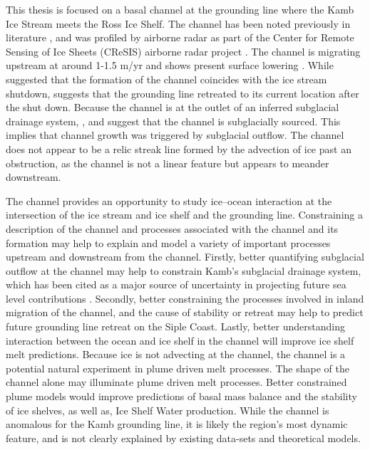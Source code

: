 This thesis is focused on a basal channel at the grounding line where the Kamb Ice Stream meets the Ross Ice Shelf. The channel has been noted previously in literature \citep{le2009subglacial,alley2016impacts,kim2016active,goeller2015subglacial,horgan2017poststagnation}, and was profiled by airborne radar as part of the Center for Remote Sensing of Ice Sheets (CReSIS) airborne radar project \citep{arnold2020cresis}. The channel is migrating upstream at around 1-1.5 m/yr and shows present surface lowering \citep{kim2016active}. While \cite{kim2016active} suggested that the formation of the channel coincides with the ice stream shutdown,   \cite{horgan2017poststagnation} suggests that the grounding line retreated to its current location after the shut down. Because the channel is at the outlet of an inferred subglacial drainage system, \cite{le2009subglacial}, \cite{alley2016impacts} and \cite{kim2016active} suggest that the channel is subglacially sourced. This implies that channel growth was triggered by subglacial outflow. The channel does not appear to be a relic streak line formed by the advection of ice past an obstruction, as the channel is not a linear feature but appears to meander downstream.



The channel provides an opportunity to study ice--ocean interaction at the intersection of the ice stream and ice shelf and the grounding line.  Constraining a description of the channel and processes associated with the channel and its formation may help to explain and model a variety of important processes upstream and downstream from the channel. Firstly, better quantifying subglacial outflow at the channel may help to constrain Kamb's subglacial drainage system, which has been cited as a major source of uncertainty in projecting future sea level contributions \citep{bougamont2015reactivation}. Secondly, better constraining the processes involved in inland migration of the channel, and the cause of stability or retreat may help to predict future grounding line retreat on the Siple Coast. Lastly, better understanding interaction between the ocean and ice shelf in the channel will improve ice shelf melt predictions.  Because ice is not advecting at the channel, the channel is a potential natural experiment in plume driven melt processes. The shape of the channel alone may illuminate plume driven melt processes.  Better constrained plume models would improve predictions of basal mass balance and the stability of ice shelves, as well as, Ice Shelf Water production.  While the channel is anomalous for the Kamb grounding line, it is likely the region's most dynamic feature, and is not clearly explained by existing data-sets and theoretical models.

